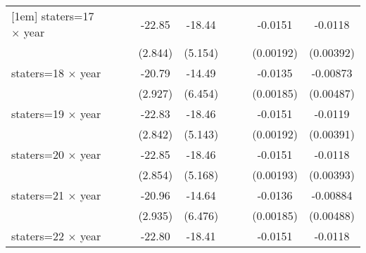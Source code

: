 {\begin{longtable}{l*{8}{c}}
[1em]
staters=17 $\times$ year&                     &                     &      -22.85\sym{***}&      -18.44\sym{***}&                     &                     &     -0.0151\sym{***}&     -0.0118\sym{***}\\
                    &                     &                     &     (2.844)         &     (5.154)         &                     &                     &   (0.00192)         &   (0.00392)         \\
[1em]
staters=18 $\times$ year&                     &                     &      -20.79\sym{***}&      -14.49\sym{**} &                     &                     &     -0.0135\sym{***}&    -0.00873\sym{*}  \\
                    &                     &                     &     (2.927)         &     (6.454)         &                     &                     &   (0.00185)         &   (0.00487)         \\
[1em]
staters=19 $\times$ year&                     &                     &      -22.83\sym{***}&      -18.46\sym{***}&                     &                     &     -0.0151\sym{***}&     -0.0119\sym{***}\\
                    &                     &                     &     (2.842)         &     (5.143)         &                     &                     &   (0.00192)         &   (0.00391)         \\
[1em]
staters=20 $\times$ year&                     &                     &      -22.85\sym{***}&      -18.46\sym{***}&                     &                     &     -0.0151\sym{***}&     -0.0118\sym{***}\\
                    &                     &                     &     (2.854)         &     (5.168)         &                     &                     &   (0.00193)         &   (0.00393)         \\
[1em]
staters=21 $\times$ year&                     &                     &      -20.96\sym{***}&      -14.64\sym{**} &                     &                     &     -0.0136\sym{***}&    -0.00884\sym{*}  \\
                    &                     &                     &     (2.935)         &     (6.476)         &                     &                     &   (0.00185)         &   (0.00488)         \\
[1em]
staters=22 $\times$ year&                     &                     &      -22.80\sym{***}&      -18.41\sym{***}&                     &                     &     -0.0151\sym{***}&     -0.0118\sym{***}\\

\end{longtable}}
